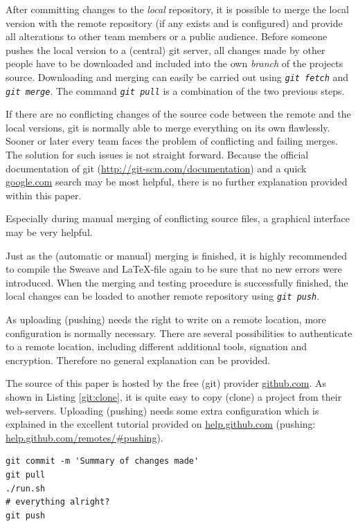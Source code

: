\documentclass{ifacconf}
\begin{document}
After committing changes to the \textit{local} repository, it is possible to merge the local version 
with the remote repository (if any exists and is configured) and provide all alterations to other team members or a
public audience. Before someone pushes the local version to a (central) git server, all changes made
by other people have to be downloaded and included into the own \textit{branch} of the projects source.
Downloading and merging can easily be carried out using \textit{\lstinline!git fetch!} and 
\textit{\lstinline!git merge!}. The command \textit{\lstinline!git pull!} is a combination of
the two previous steps.

If there are no conflicting changes of the source code between the remote and the local
versions, git is normally able to merge everything on its own flawlessly. Sooner or later every team
faces the problem of conflicting and failing merges. The solution for such issues is not straight forward.
Because the official documentation of git (\url{http://git-scm.com/documentation}) and a quick 
\url{google.com} search may be most helpful, there is no further explanation provided within this paper.

Especially during manual merging of conflicting source files, a graphical interface may be very helpful.

Just as the (automatic or manual) merging is finished, it is highly recommended to compile 
the Sweave and \LaTeX-file again to be sure that no new errors were introduced. When the merging and
testing procedure is successfully finished, the local changes can be loaded to another remote repository
using \textit{\lstinline!git push!}.

As uploading (pushing) needs the right to write on a remote location, more configuration is normally 
necessary. There are several possibilities to authenticate to a remote location, 
including different additional tools, signation and encryption. Therefore no general explanation can be provided.

The source of this paper is hosted by the free (git) provider \url{github.com}. As shown in 
Listing \ref{git:clone}, it is quite easy to copy (clone) a project from their web-servers. 
Uploading (pushing) needs some extra configuration which is explained in the excellent tutorial
provided on \url{help.github.com} (pushing: \url{help.github.com/remotes/#pushing}).

\begin{lstlisting}
git commit -m 'Summary of changes made'
git pull
./run.sh
# everything alright?
git push
\end{lstlisting}
\end{document}
